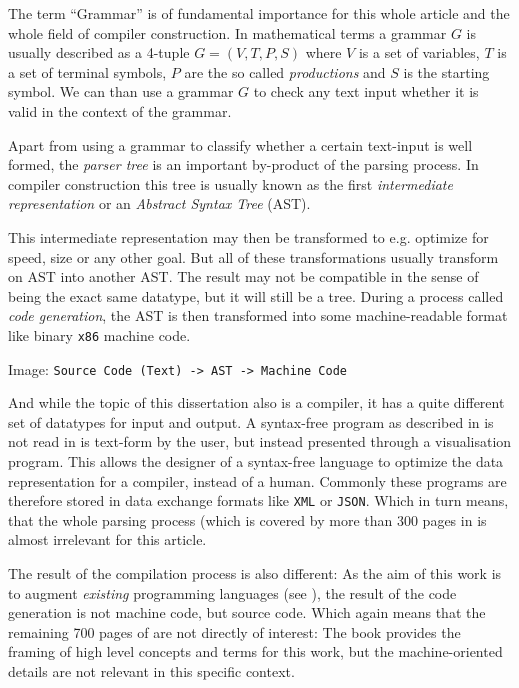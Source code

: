 The term \enquote{Grammar} is of fundamental importance for this whole article and the whole field of compiler construction. In mathematical terms a grammar $G$ is usually described as a 4-tuple $G = (V, T, P, S)$ where $V$ is a set of variables, $T$ is a set of terminal symbols, $P$ are the so called \textit{productions} and $S$ is the starting symbol\cite[Chapter 5]{hopcroft_formal_languages}. We can than use a grammar $G$ to check any text input whether it is valid in the context of the grammar.

Apart from using a grammar to classify whether a certain text-input is well formed, the \textit{parser tree} is an important by-product of the parsing process. In compiler construction this tree is usually known as the first \textit{intermediate representation} or an \textit{Abstract Syntax Tree} (AST)\cite[Chapter 6]{dragon_book}.

This intermediate representation may then be transformed to e.g. optimize for speed, size or any other goal. But all of these transformations usually transform on AST into another AST. The result may not be compatible in the sense of being the exact same datatype, but it will still be a tree. During a process called \textit{code generation}, the AST is then transformed into some machine-readable format like binary \texttt{x86} machine code\cite[Chapter 8]{dragon_book}.

Image: \texttt{Source Code (Text) -> AST -> Machine Code}

And while the topic of this dissertation also is a compiler, it has a quite different set of datatypes for input and output. A syntax-free program as described in  is not read in is text-form by the user, but instead presented through a visualisation program. This allows the designer of a syntax-free language to optimize the data representation for a compiler, instead of a human. Commonly these programs are therefore stored in data exchange formats like \texttt{XML} or \texttt{JSON}. Which in turn means, that the whole parsing process (which is covered by more than 300 pages in \cite{dragon_book} is almost irrelevant for this article.

The result of the compilation process is also different: As the aim of this work is to augment \textit{existing} programming languages (see ), the result of the code generation is not machine code, but source code. Which again means that the remaining 700 pages of \cite{dragon_book} are not directly of interest: The book provides the framing of high level concepts and terms for this work, but the machine-oriented details are not relevant in this specific context.

